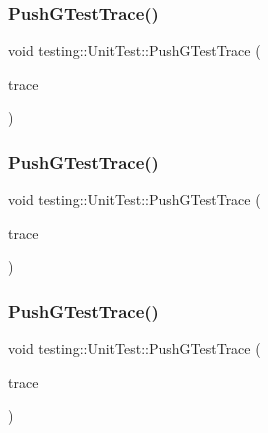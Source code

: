\subsubsection{\texorpdfstring{PushGTestTrace()}{PushGTestTrace()}\hspace{0.1cm}{\footnotesize\ttfamily [1/3]}}
{\footnotesize\ttfamily void testing\+::\+Unit\+Test\+::\+Push\+G\+Test\+Trace (\begin{DoxyParamCaption}\item[{const internal\+::\+Trace\+Info \&}]{trace }\end{DoxyParamCaption})\hspace{0.3cm}{\ttfamily [private]}}

\mbox{\label{classtesting_1_1_unit_test_af455b953108ff09b3b6e41011653e78a}} 
\subsubsection{\texorpdfstring{PushGTestTrace()}{PushGTestTrace()}\hspace{0.1cm}{\footnotesize\ttfamily [2/3]}}
{\footnotesize\ttfamily void testing\+::\+Unit\+Test\+::\+Push\+G\+Test\+Trace (\begin{DoxyParamCaption}\item[{const internal\+::\+Trace\+Info \&}]{trace }\end{DoxyParamCaption})\hspace{0.3cm}{\ttfamily [private]}}

\mbox{\label{classtesting_1_1_unit_test_af455b953108ff09b3b6e41011653e78a}} 
\subsubsection{\texorpdfstring{PushGTestTrace()}{PushGTestTrace()}\hspace{0.1cm}{\footnotesize\ttfamily [3/3]}}
{\footnotesize\ttfamily void testing\+::\+Unit\+Test\+::\+Push\+G\+Test\+Trace (\begin{DoxyParamCaption}\item[{const internal\+::\+Trace\+Info \&}]{trace }\end{DoxyParamCaption})\hspace{0.3cm}{\ttfamily [private]}}

